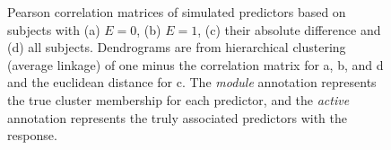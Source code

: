 \begin{appendices}
\begin{figure}[H]
	\caption{Pearson correlation matrices of simulated predictors based on subjects with (a) $E=0$, (b) $E=1$, (c) their absolute difference and (d) all subjects. Dendrograms are from hierarchical clustering (average linkage) of one minus the correlation matrix for a, b, and d and the euclidean distance for c. The \textit{module} annotation represents the true cluster membership for each predictor, and the \textit{active} annotation represents the truly associated predictors with the response.}
	\label{fig:simcorr}
\end{figure}




\end{appendices}